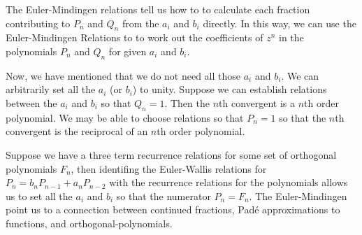 \documentclass[16pt]{article}
\numberwithin{equation}{section}
\numberwithin{figure}{section}
\numberwithin{figure}{section}
\numberwithin{equation}{section}
\begin{document}
The Euler-Mindingen relations tell us how to to calculate each fraction contributing 
to $P_n$ and 
$Q_n$  from the $a_i$ and $b_i$ directly.
In this way, we can use the Euler-Mindingen Relations to to work out the
 coefficients of $z^n$ in the polynomials
$P_n$ and $Q_n$ for given $a_i$ and $b_i$.

Now, we have mentioned that we do not need all those $a_i$ and $b_i$. We can arbitrarily
set all the $a_i$ (or $b_i$) to unity. Suppose we can establish relations between the $a_i$
and $b_i$ so that $Q_n=1$. Then the $n$th convergent is a $n$th order polynomial. We may be able to
choose relations so that $P_n=1$ so that the $n$th convergent is the
reciprocal of an $n$th order polynomial.

Suppose we have a three term recurrence relations for some set of orthogonal polynomials $F_n$,
then identifing the Euler-Wallis relations for $P_n=b_n P_{n-1}+a_n P_{n-2}$ with
the recurrence relations for the polynomials allows us to set all the $a_i$ and $b_i$
 so that the numerator $P_n=F_n$. The Euler-Mindingen point us to a connection between
continued fractions, Pad{\'e} approximations to functions, and orthogonal-polynomials.
\end{document}
